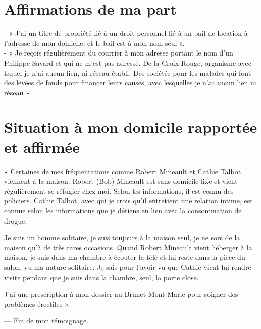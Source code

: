 \documentclass[12pt]{article}
\begin{document}
\section*{Affirmations de ma part}

- « J’ai un titre de propriété lié à un droit personnel lié à un bail de location à l’adresse de mon domicile, et le bail est à mon nom seul ».\\
- « Je reçois régulièrement du courrier à mon adresse portant le nom d’un Philippe Savard et qui ne m’est pas adressé. De la Croix-Rouge, organisme avec lequel je n’ai aucun lien, ni réseau établi. Des sociétés pour les malades qui font des levées de fonds pour financer leurs causes, avec lesquelles je n’ai aucun lien ni réseau ».

\section*{Situation à mon domicile rapportée et affirmée}

« Certaines de mes fréquentations comme Robert Mineault et Cathie Talbot viennent à la maison. Robert (Bob) Mineault est sans domicile fixe et vient régulièrement se réfugier chez moi. Selon les informations, il est connu des policiers. Cathie Talbot, avec qui je crois qu’il entretient une relation intime, est connue selon les informations que je détiens en lien avec la consommation de drogue.

Je suis un homme solitaire, je suis toujours à la maison seul, je ne sors de la maison qu’à de très rares occasions. Quand Robert Mineault vient héberger à la maison, je suis dans ma chambre à écouter la télé et lui reste dans la pièce du salon, vu ma nature solitaire. Je sais pour l’avoir vu que Cathie vient lui rendre visite pendant que je suis dans la chambre, seul, la porte close.

J’ai une prescription à mon dossier au Brunet Mont-Marie pour soigner des problèmes érectiles ».

\bigskip
--- Fin de mon témoignage.
\end{document}
